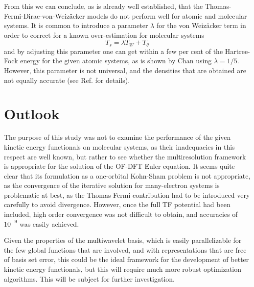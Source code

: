 From this we can conclude, as is already well established, that the Thomas-Fermi-Dirac-von-Weiz\"{a}cker models do
not perform well for atomic and molecular systems. It is common to introduce a parameter $\lambda$ for the von Weiz\"{a}cker
term in order to correct for a known over-estimation for molecular systems
\begin{equation}
    T_s = \lambda T_W + T_\theta
\end{equation}
and by adjusting this parameter one can get within a few per cent of the Hartree-Fock energy for the given atomic systems, 
as is shown by Chan \etal\cite{Chan:2000} using $\lambda=1/5$. However, this parameter is not universal, and the densities 
that are obtained are not equally accurate (see Ref.\cite{Chan:2000} for details).

\section{Outlook}
The purpose of this study was not to examine the performance of the given kinetic energy 
functionals on molecular systems, as their inadequacies in this respect are well known, 
but rather to see whether the multiresolution framework is appropriate for the solution 
of the OF-DFT Euler equation. It seems quite clear that its formulation as a one-orbital 
Kohn-Sham problem is not appropriate, as the convergence of the iterative solution for 
many-electron systems is problematic at best, as the Thomas-Fermi contribution had to be 
introduced very carefully to avoid divergence. However, once the full TF potential had 
been included, high order convergence was not difficult to obtain, and accuracies of 
$10^{-9}$ was easily achieved.

Given the properties of the multiwavelet basis, which is easily parallelizable for the few 
global functions that are involved, and with representations that are free of basis set error, 
this could be the ideal framework for the development of better kinetic energy functionals, 
but this will require much more robust optimization algorithms. This will be subject for 
further investigation.
